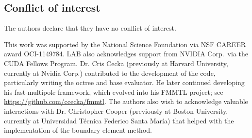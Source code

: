 \documentclass[smallcondensed,final]{svjour3}
\begin{document}
\clearpage

\subsection*{Conflict of interest}
The authors declare that they have no conflict of interest.

\begin{acknowledgements}
	This work was supported by the National Science Foundation via NSF CAREER award OCI-1149784. LAB also acknowledges support from NVIDIA Corp.\ via the CUDA Fellows Program. 
   Dr. Cris Cecka (previously at Harvard University, currently at Nvidia Corp.) contributed to the development of the code, particularly writing the octree and base evaluator. He later continued developing his fast-multipole framework, which evolved into his FMMTL project; see \href{https://github.com/ccecka/fmmtl}{https://github.com/ccecka/fmmtl}.
   The authors also wish to acknowledge valuable interactions with Dr. Christopher Cooper (previously at Boston University, currently at Universidad T{\'e}cnica Federico Santa Mar{\'i}a) that helped with the implementation of the boundary element method.
\end{acknowledgements}



\end{document}
